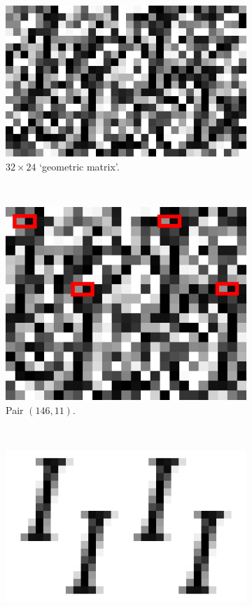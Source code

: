 \documentclass{llncs}
\begin{document}
\begin{figure}[b]
\centering
\begin{subfigure}[t]{0.35\textwidth}
\centering
\includegraphics[scale=.25]{img/Garamond-I_cropped.png}
\caption{$32\times 24$ `geometric matrix'.}
\label{fig-example1a}
\end{subfigure}%
~
\begin{subfigure}[t]{0.21\textwidth}
\centering
\includegraphics[scale=.25]{img/Garamond-I-highlight_cropped.png}
\caption{Pair $(146,11)$.}
\label{fig-example1b}
\end{subfigure}%
~
\begin{subfigure}[t]{0.37\textwidth}
\centering
\includegraphics[scale=.25]{img/Garamond-I-clean_cropped.png}

\end{subfigure}
\end{figure}
\end{document}

